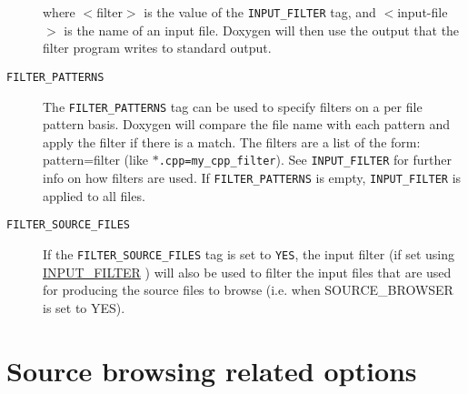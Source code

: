 \begin{description}
where $<$filter$>$ is the value of the {\tt INPUT\_\-FILTER} tag, and $<$input-file$>$ is the name of an input file. Doxygen will then use the output that the filter program writes to standard output.

\label{config_cfg_filter_patterns}
\hypertarget{config_cfg_filter_patterns}{}
 \item[{\tt FILTER\_\-PATTERNS} ] The {\tt FILTER\_\-PATTERNS} tag can be used to specify filters on a per file pattern basis. Doxygen will compare the file name with each pattern and apply the filter if there is a match. The filters are a list of the form: pattern=filter (like {\tt $\ast$.cpp=my\_\-cpp\_\-filter}). See {\tt INPUT\_\-FILTER} for further info on how filters are used. If {\tt FILTER\_\-PATTERNS} is empty, {\tt INPUT\_\-FILTER} is applied to all files.

\label{config_cfg_filter_source_files}
\hypertarget{config_cfg_filter_source_files}{}
 \item[{\tt FILTER\_\-SOURCE\_\-FILES} ] If the {\tt FILTER\_\-SOURCE\_\-FILES} tag is set to {\tt YES}, the input filter (if set using \hyperlink{config_cfg_input_filter}{INPUT\_\-FILTER} ) will also be used to filter the input files that are used for producing the source files to browse (i.e. when SOURCE\_\-BROWSER is set to YES).

\end{description}
\hypertarget{config_sourcebrowser_index}{}\section{Source browsing related options}\label{config_sourcebrowser_index}
\label{config_cfg_source_browser}
\hypertarget{config_cfg_source_browser}{}
